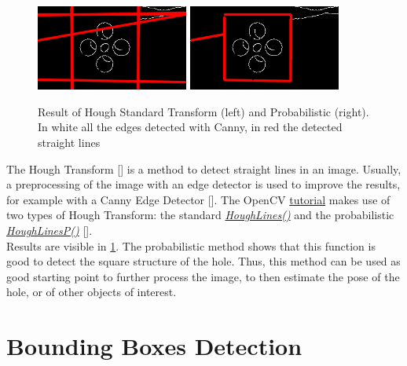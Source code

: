 \begin{figure}[H]
	\centering
		\includegraphics[width=5.0cm]{canny_HoughStandard}
		\qquad
		\includegraphics[width=5.0cm]{canny_HoughProb}
	\caption[Result of Standard Hough Transform and Probabilistic one]{Result of Hough Standard Transform (left) and Probabilistic (right). In white all the edges detected with Canny, in red the detected straight lines}
	\label{fig:HoughStandard}
\end{figure}

The Hough Transform [\cite{DudaHoughTrasf}] is a method to detect straight lines in an image. Usually, a preprocessing of the image with an edge detector is used to improve the results, for example with a Canny Edge Detector [\cite{CannyEdge}]. The OpenCV \href{https://docs.opencv.org/3.4/d9/db0/tutorial_hough_lines.html}{tutorial} makes use of two types of Hough Transform: the standard \href{https://docs.opencv.org/3.4/dd/d1a/group__imgproc__feature.html#ga46b4e588934f6c8dfd509cc6e0e4545a}{\textit{HoughLines()}} and the probabilistic \href{https://docs.opencv.org/3.4/dd/d1a/group__imgproc__feature.html#ga8618180a5948286384e3b7ca02f6feeb}{\textit{HoughLinesP()}} [\cite{houghprob}].\\
Results are visible in \ref{fig:HoughStandard}. The probabilistic method shows that this function is good to detect the square structure of the hole. 
Thus, this method can be used as good starting point to further process the image, to then estimate the pose of the hole, or of other objects of interest.

\section{Bounding Boxes Detection}

